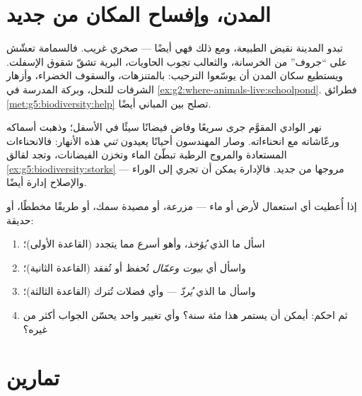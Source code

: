 \section{المدن، وإفساح المكان من جديد}

\begin{example}\label{ex:g5:people-and-nature:city}
تبدو المدينة نقيض الطبيعة، ومع ذلك فهي  أيضًا ---  صخري
غريب. فالسمامة تعشّش على ``جروف'' من الخرسانة، والثعالب تجوب
الحاويات،  البرية تشقّ شقوق الإسفلت. ويستطيع سكان المدن
أن يوسّعوا الترحيب: بالمتنزهات، والسقوف الخضراء، وأزهار الشرفات
للنحل، وبركة المدرسة في \cref{ex:g2:where-animals-live:schoolpond}.
فطرائق \cref{met:g5:biodiversity:help} تصلح بين المباني أيضًا.
\end{example}

\begin{example}\label{ex:g5:people-and-nature:river}
نهر الوادي المقوَّم جرى سريعًا وفاض فيضانًا سيئًا في الأسفل؛ وذهبت
أسماكه ورعّاشاته مع انحناءاته. وصار المهندسون أحيانًا يعيدون
\emph{ثني} هذه الأنهار: فالانحناءات المستعادة والمروج الرطبة تبطّئ
الماء وتخزن الفيضانات، وتجد لقالق \cref{ex:g5:biodiversity:storks}
مروجها من جديد. فالإدارة يمكن أن تجري إلى الوراء --- والإصلاح إدارة
أيضًا.
\end{example}

\begin{method}\label{met:g5:people-and-nature:judge}
إذا أُعطيت أي استعمال لأرض أو ماء --- مزرعة، أو مصيدة سمك، أو طريقًا
مخططًا، أو حديقة:
\begin{enumerate}
  \item اسأل ما الذي \emph{يُؤخذ}، وأهو أسرع مما يتجدد (القاعدة
        الأولى)؛
  \item واسأل أي \emph{بيوت وعمّال} تُحفظ أو تُفقد (القاعدة
        الثانية)؛
  \item واسأل ما الذي \emph{يُردّ} --- وأي فضلات تُترك (القاعدة
        الثالثة)؛
  \item ثم احكم: أيمكن أن يستمر هذا مئة سنة؟ وأي تغيير واحد يحسّن
        الجواب أكثر من غيره؟
\end{enumerate}
\end{method}

\section{تمارين}

